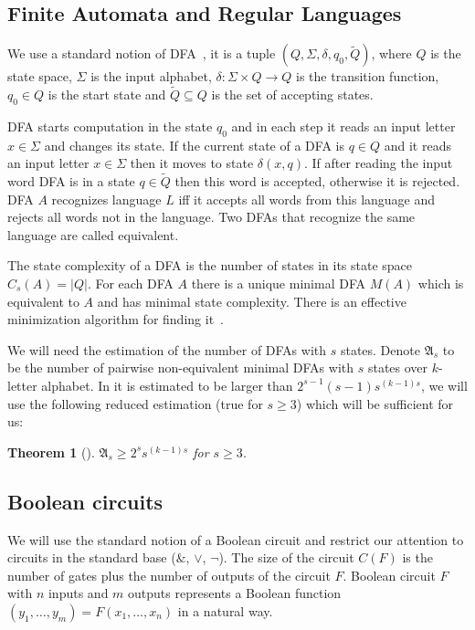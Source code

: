 \documentclass[copyright, creativecommons]{eptcs}
\newtheorem{theorem}{Theorem}[section]
\begin{document}
\subsection{Finite Automata and Regular Languages}
We use a standard notion of DFA~\cite{M55}, it is a tuple $(Q, \Sigma, \delta, q_0, \tilde{Q})$, where
$Q$ is the state space,
$\Sigma$ is the input alphabet,
$\delta: \Sigma\times Q\rightarrow Q$ is the transition function,
$q_0\in Q$ is the start state and
$\tilde{Q}\subseteq Q$ is the set of accepting states.


DFA starts computation
in the state $q_0$ and in each step it reads an input letter $x\in \Sigma$  and changes its state.
If the current state of a DFA is $q\in Q$ and it reads an input letter $x\in \Sigma$ then it
moves to state $\delta(x, q)$. If after reading the input word DFA
is in a state $q\in \tilde{Q}$ then this word is accepted, otherwise it is rejected. DFA $A$ recognizes
language $L$ iff it accepts all words from this language and rejects all words not in the language.
Two DFAs that recognize the same language are called equivalent.
 
The state complexity of a DFA is the number of states in its state space $C_s(A)=|Q|$. For each DFA $A$
there is a unique minimal DFA $M(A)$ which is equivalent to $A$ and has minimal state complexity.
There is an effective minimization algorithm for finding it~\cite{B70}.

We will need the estimation of the number of DFAs with $s$ states.
Denote $\mathfrak{A}_s$ to be
the number of pairwise non-equivalent minimal DFAs with $s$ states over $k$-letter alphabet.
In \cite{S01} it is estimated to be larger
than $2^{s-1}(s-1)s^{(k-1)s}$, we will use the following reduced estimation (true for $s\geq 3$) which will be sufficient for us:
\begin{theorem}[\cite{S01}]
\label{autSkaits}
$\mathfrak{A}_s\geq 2^{s}s^{(k-1)s}$ for $s\geq 3$.
\end{theorem} 

\subsection{Boolean circuits}

We will use the standard notion of a Boolean circuit
and restrict our attention to circuits in the standard base ($\&$, $\vee$, $\neg$).
The size of the circuit $C(F)$ is
the number of gates plus the number of outputs of the circuit $F$.
Boolean circuit $F$ with $n$ inputs and $m$ outputs represents a Boolean function $(y_1,\dots, y_m)=F(x_1,\dots, x_n)$ in a natural way.
\end{document}
